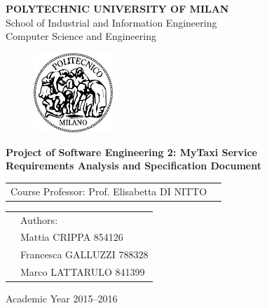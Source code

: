 \documentclass[a4paper, 12pt]{report}
\begin{document}
\begin{titlepage}

\begin{center}
\Large
\textbf{POLYTECHNIC UNIVERSITY OF MILAN} \\
\Large
School of Industrial and Information Engineering \\
Computer Science and Engineering
\end{center}

\addvspace{0.8cm}
\begin{figure}[h]
\begin{center}
\includegraphics[width=3cm]{cpt/img/polimi}
\end{center}
\end{figure}

\addvspace{0.1cm}
\begin{center}
\LARGE

\textbf{Project of Software Engineering 2: MyTaxi Service \\
Requirements Analysis and Specification Document}

\end{center}

\addvspace{0.5cm}
\Large
\begin{center}
\begin{tabular}{p{}p{}}
Course Professor: Prof. Elisabetta DI NITTO \\
\end{tabular}
\end{center}

\addvspace{0.6cm}
\Large
\begin{center}
\begin{tabular}{p{}p{}}
& Authors: \\
& Mattia 	CRIPPA		854126\\
& Francesca GALLUZZI	788328\\
& Marco 	LATTARULO	841399
\end{tabular}
\end{center}

\vfill
\Large
\begin{center}
Academic Year 2015--2016
\end{center}
\end{titlepage}
\end{document}
